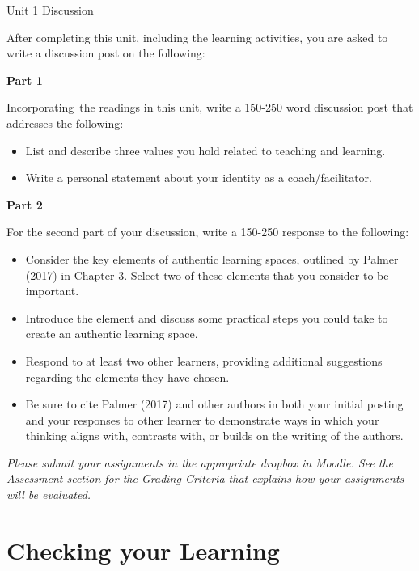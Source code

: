 \documentclass[
]{book}
\providecommand{\tightlist}{%
  \setlength{\itemsep}{0pt}\setlength{\parskip}{0pt}}
\begin{document}
\begin{assessment}
{Unit 1 Discussion}

After completing this unit, including the learning activities, you are asked to write a discussion post on the following:

\textbf{Part 1}

Incorporating~the readings in this unit, write a 150-250 word discussion post that addresses the following:

\begin{itemize}
\tightlist
\item
  List and describe three values you hold related to teaching and learning.\\
\item
  Write a personal statement about your identity as a coach/facilitator.
\end{itemize}

\textbf{Part 2}

For the second part of your discussion, write a 150-250 response to the following:

\begin{itemize}
\tightlist
\item
  Consider the key elements of authentic learning spaces, outlined by Palmer (2017) in Chapter 3. Select two of these elements that you consider to be important.\\
\item
  Introduce the element and discuss some practical steps you could take to create an authentic learning space.\\
\item
  Respond to at least two other learners, providing additional suggestions regarding the elements they have chosen.\\
\item
  Be sure to cite Palmer (2017) and other authors in both your initial posting and your responses to other learner to demonstrate ways in which your thinking aligns with, contrasts with, or builds on the writing of the authors.
\end{itemize}
\end{assessment}

\begin{caution}
\emph{Please submit your assignments in the appropriate dropbox in Moodle. See the Assessment section for the Grading Criteria that explains how your assignments will be evaluated.}
\end{caution}

\hypertarget{checking-your-learning}{%
\section*{Checking your Learning}\label{checking-your-learning}}
\end{document}
